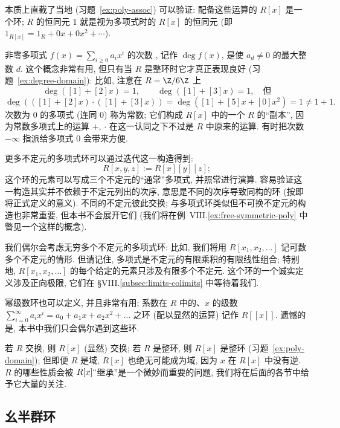 本质上直截了当地 (习题~\ref{ex:poly-assoc}) 可以验证: 配备这些运算的 $R[x]$ 是一个环; $R$ 的恒同元 $1$ 就是视为多项式时的 $R[x]$ 的恒同元 (即 $1_{R[x]} = 1_R + 0x + 0x^2 + \cdots$).

非零多项式 $f(x) = \sum_{i \geq 0} a_i x^i$ 的次数%
, 记作 $\deg f(x)$, 是使 $a_d \neq 0$ 的最大整数 $d$. 这个概念非常有用, 但只有当 $R$ 是整环时它才真正表现良好 (习题~\ref{ex:degree-domain}): 比如, 注意在 $R = \Z/6\Z$ 上
\[
\deg([1] + [2]x) = 1, \qquad \deg([1] + [3]x) = 1, \quad \text{但}
\]
\[
\deg(([1] + [2]x) \cdot ([1] + [3]x)) = \deg([1] + [5]x + [0]x^2) = 1 \neq 1 + 1.
\]
次数为 $0$ 的多项式 (连同 $0$) 称为常数; 它们构成 $R[x]$ 中的一个 $R$ 的``副本'', 因为常数多项式上的运算 $+$, $\cdot$ 在这一认同之下不过是 $R$ 中原来的运算. 有时把次数 $-\infty$ 指派给多项式 $0$ 会带来方便.

更多不定元的多项式环可以通过迭代这一构造得到:
\[
R[x, y, z] := R[x][y][z];
\]
这个环的元素可以写成三个不定元的``通常''多项式, 并照常进行演算. 容易验证这一构造其实并不依赖于不定元列出的次序, 意思是不同的次序导致同构的环 (按即将正式定义的意义). 不同的不定元彼此交换; 与多项式环类似但不可换不定元的构造也非常重要, 但本书不会展开它们 (我们将在例~VIII.\ref{ex:free-symmetric-poly} 中瞥见一个这样的概念).

我们偶尔会考虑无穷多个不定元的多项式环: 比如, 我们将用 $R[x_1, x_2, \ldots]$ 记可数多个不定元的情形. 但请记住, 多项式是不定元的有限乘积的有限线性组合; 特别地, $R[x_1, x_2, \ldots]$ 的每个给定的元素只涉及有限多个不定元. 这个环的一个诚实定义涉及正向极限, 它们在 \S VIII.\ref{subsec:limits-colimits} 中等待着我们.

幂级数环也可以定义, 并且非常有用; 系数在 $R$ 中的、$x$ 的级数 $\sum_{i=0}^{\infty} a_i x^i = a_0 + a_1 x + a_2 x^2 + \dots$ 之环 (配以显然的运算) 记作 $R[[x]]$. 遗憾的是, 本书中我们只会偶尔遇到这些环.

若 $R$ 交换, 则 $R[x]$ (显然) 交换; 若 $R$ 是整环, 则 $R[x]$ 是整环 (习题~\ref{ex:poly-domain}); 但即便 $R$ 是域, $R[x]$ 也绝无可能成为域, 因为 $x$ 在 $R[x]$ 中没有逆. $R$ 的哪些性质会被 $R[x]``$继承''是一个微妙而重要的问题, 我们将在后面的各节中给予它大量的关注.

\subsection{幺半群环}
\label{subsec:monoid-rings}

